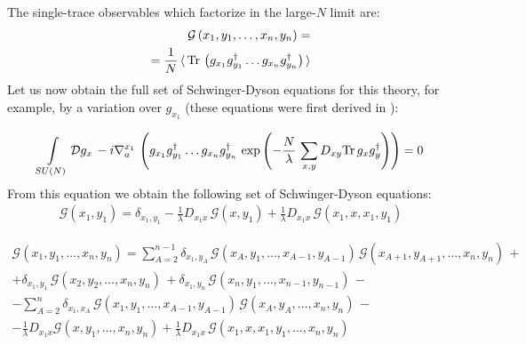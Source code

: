 \documentclass[twocolumn,showpacs,preprintnumbers,superscriptaddress,amsmath,floatfix,amssymb,secnumarabic]{revtex4}
\newcommand{\lr}[1]{ \left( #1 \right) }
\newcommand{\vev}[1]{ \langle \, #1 \, \rangle }
\newcommand{\tr}{ {\rm Tr} \, }
\newcommand{\expa}[1]{ \exp{\left( #1 \right)} }
\begin{document}
The single-trace observables which factorize in the large-$N$ limit are:
\begin{eqnarray}
\label{gf_def}
\mathcal{G}\lr{x_1, y_1, \ldots, x_n, y_n}
= \nonumber \\ =
\frac{1}{N}\, \vev{ \tr\lr{
g_{x_1} g^{\dag}_{y_1} \ldots g_{x_n} g^{\dag}_{y_n}} }
\end{eqnarray}
Let us now obtain the full set of Schwinger-Dyson equations for this theory, for example, by a variation over $g_{x_1}$ (these equations were first derived in \cite{GonzalezArroyo:84:1}):
\begin{widetext}
\begin{eqnarray}
\label{SD_derivation1}
\int\limits_{SU\lr{N}} \mathcal{D} g_{x} \, -i \nabla_a^{x_1} \,
\lr{g_{x_1} g^{\dag}_{y_1} \ldots g_{x_n} g^{\dag}_{y_n} \, \expa{ -\frac{N}{\lambda}\, \sum \limits_{x,y} D_{xy} \tr g_x g^{\dag}_y} } = 0
\end{eqnarray}
From this equation we obtain the following set of Schwinger-Dyson equations:
\begin{eqnarray}
\label{SDs_n2}
\mathcal{G}\lr{x_1, y_1} =
\delta_{x_1, y_1}
 - %
\frac{1}{\lambda} D_{x_1 x} \, \mathcal{G}\lr{x, y_1}
 +
\frac{1}{\lambda} D_{x_1 x} \, \mathcal{G}\lr{x_1, x, x_1, y_1}
\end{eqnarray}

\begin{eqnarray}
\label{SDs}
\mathcal{G}\lr{x_1, y_1, \ldots, x_n, y_n}
= %
\sum\limits_{A=2}^{n-1} \delta_{x_1, y_A} \,
\mathcal{G}\lr{x_A, y_1, \ldots, x_{A-1}, y_{A-1}}\,
\mathcal{G}\lr{x_{A+1}, y_{A+1}, \ldots, x_n, y_n}\,
+ \nonumber \\ +
\delta_{x_1, y_1} \, \mathcal{G}\lr{x_2, y_2, \ldots, x_n, y_n}\,
+
\delta_{x_1, y_n} \, \mathcal{G}\lr{x_n, y_1, \ldots, x_{n-1}, y_{n-1}}\,
- \nonumber \\ -
\sum\limits_{A=2}^{n} \delta_{x_1, x_A} \,
 \mathcal{G}\lr{x_1, y_1, \ldots, x_{A-1}, y_{A-1}}\,
 \mathcal{G}\lr{x_A, y_A, \ldots, x_n, y_n}\,
- \nonumber \\ -
\frac{1}{\lambda} D_{x_1 x} \mathcal{G}\lr{x, y_1, \ldots, x_n, y_n}
+
\frac{1}{\lambda} D_{x_1 x} \, \mathcal{G}\lr{x_1, x, x_1, y_1, \ldots, x_n, y_n}
\end{eqnarray}


\end{widetext}
\end{document}
